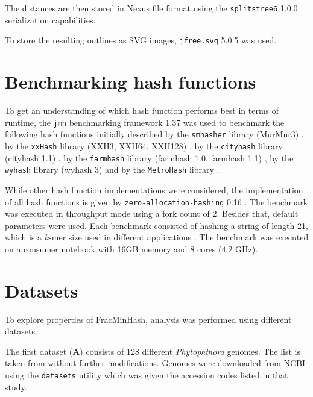 The distances are then stored in Nexus file format using the
\texttt{splitstree6} 1.0.0 \cite{husonApplicationPhylogeneticNetworks2006}
serialization capabilities.

To store the resulting outlines as SVG images, \texttt{jfree.svg} 5.0.5
\cite{gilbertJFreeSVG2023} was used.


\section{Benchmarking hash functions}
To get an understanding of which hash function performs best in terms of
runtime, the \texttt{jmh} benchmarking framework 1.37
\cite{theopenjdkcommunityJavaMicrobenchmarkHarness2023} was used to benchmark
the following hash functions initially described by the \texttt{smhasher}
library (MurMur3) \cite{applebyAapplebySmhasher}, by the \texttt{xxHash} library
(XXH3, XXH64, XXH128) \cite{colletXxHash2023}, by the \texttt{cityhash} library
(cityhash 1.1) \cite{pikeCityhash2011}, by the \texttt{farmhash} library
(farmhash 1.0, farmhash 1.1) \cite{pikeFarmhash2014}, by the \texttt{wyhash}
library (wyhash 3) \cite{wangWyhash2019} and by the \texttt{MetroHash} library
\cite{rogersMetroHash2018}.
 
While other hash function implementations were considered, the implementation of
all hash functions is given by \texttt{zero-allocation-hashing} 0.16
\cite{ZeroAllocationHashing2022}. The benchmark was executed in throughput mode
using a fork count of 2. Besides that, default parameters were used. Each
benchmark consisted of hashing a string of length 21, which is a $k$-mer size
used in different applications
\cite{ondovMashFastGenome2016,bagciMicrobialPhylogeneticContext2021}. The
benchmark was executed on a consumer notebook with 16GB memory and 8 cores
($4.2$ GHz).


\section{Datasets}
To explore properties of FracMinHash, analysis was performed using different
datasets. 

The first dataset (\textbf{A}) consists of 128 different \textit{Phytophthora}
genomes. The list is taken from \cite{mandalComparativeGenomeAnalysis2022}
without further modifications. Genomes were downloaded from NCBI using the
\texttt{datasets} utility \cite{sayersDatabaseResourcesNational2022} which was
given the accession codes listed in that study.

